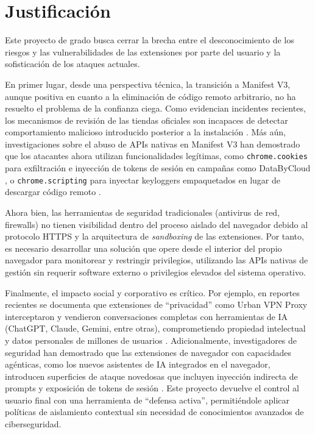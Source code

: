 \documentclass[12pt,oneside]{report}
\begin{document}
\endgroup

\section{Justificación}
\label{sec:justificacion}

\begingroup
\setlength{\parindent}{0pt}
\setlength{\parskip}{0.6em}

Este proyecto de grado busca cerrar la brecha entre el desconocimiento de los riesgos y las vulnerabilidades de las extensiones por parte del usuario y la sofisticación de los ataques actuales.

En primer lugar, desde una perspectiva técnica, la transición a Manifest V3, aunque positiva en cuanto a la eliminación de código remoto arbitrario, no ha resuelto el problema de la confianza ciega. Como evidencian incidentes recientes, los mecanismos de revisión de las tiendas oficiales son incapaces de detectar comportamiento malicioso introducido posterior a la instalación \cite{thn2025shadypanda}. Más aún, investigaciones sobre el abuso de APIs nativas en Manifest V3 han demostrado que los atacantes ahora utilizan funcionalidades legítimas, como \texttt{chrome.cookies} para exfiltración e inyección de tokens de sesión en campañas como DataByCloud \cite{pandya2026databycloud}, o \texttt{chrome.scripting} para inyectar keyloggers empaquetados en lugar de descargar código remoto \cite{singh2025study}.

Ahora bien, las herramientas de seguridad tradicionales (antivirus de red, firewalls) no tienen visibilidad dentro del proceso aislado del navegador debido al protocolo HTTPS y la arquitectura de \textit{sandboxing} de las extensiones. Por tanto, es necesario desarrollar una solución que opere desde el interior del propio navegador para monitorear y restringir privilegios, utilizando las APIs nativas de gestión sin requerir software externo o privilegios elevados del sistema operativo.

Finalmente, el impacto social y corporativo es crítico. Por ejemplo, en reportes recientes se documenta que extensiones de ``privacidad'' como Urban VPN Proxy interceptaron y vendieron conversaciones completas con herramientas de IA (ChatGPT, Claude, Gemini, entre otras), comprometiendo propiedad intelectual y datos personales de millones de usuarios \cite{dardikman2025aiconversations}. Adicionalmente, investigadores de seguridad han demostrado que las extensiones de navegador con capacidades agénticas, como los nuevos asistentes de IA integrados en el navegador, introducen superficies de ataque novedosas que incluyen inyección indirecta de prompts y exposición de tokens de sesión \cite{zenitylabs2025claude}. Este proyecto devuelve el control al usuario final con una herramienta de ``defensa activa'', permitiéndole aplicar políticas de aislamiento contextual sin necesidad de conocimientos avanzados de ciberseguridad.
\end{document}
